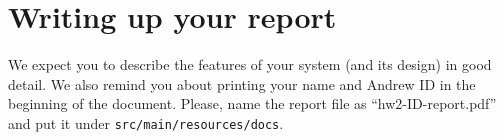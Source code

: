 
\section{Writing up your report}

We expect you to describe the features of your system (and its design) in good detail. 
We also remind you about printing your name and Andrew ID in the beginning of the document. 
Please, name the report file as ``hw2-ID-report.pdf'' and put it under \texttt{src/main/resources/docs}.
